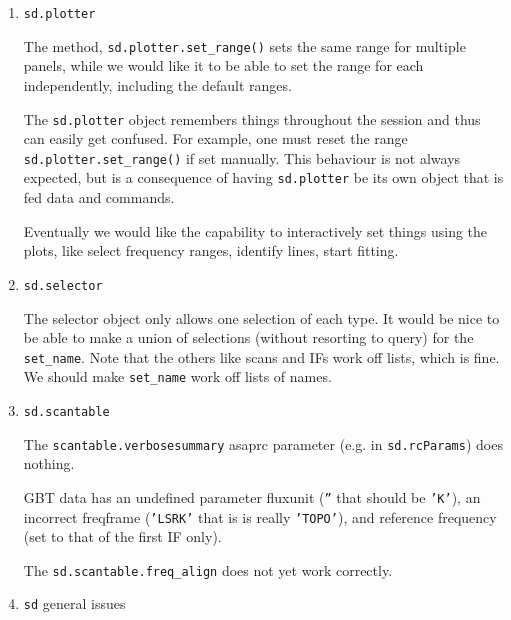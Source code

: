 \begin{enumerate}

\item {\tt sd.plotter}

  The method, {\tt sd.plotter.set\_range()} sets the same range for
  multiple panels, while we would like it to be able to set the
  range for each independently, including the default ranges.

  The {\tt sd.plotter} object remembers things throughout the session and
  thus can easily get confused. For example, one must reset the
  range {\tt sd.plotter.set\_range()} if set manually. This behaviour is
  not always expected, but is a consequence of having {\tt sd.plotter} be
  its own object that is fed data and commands.

  Eventually we would like the capability to interactively
  set things using the plots, like select frequency ranges,
  identify lines, start fitting. 

\item {\tt sd.selector}

  The selector object only allows one selection of each type.  It would be 
  nice to be able to make a union of selections (without resorting to query)
  for the {\tt set\_name}.  Note that the others like scans and IFs work off
  lists, which is fine.  We should make {\tt set\_name} work off lists of names.

\item {\tt sd.scantable}

  The {\tt scantable.verbosesummary}
  asaprc parameter (e.g. in {\tt sd.rcParams}) does nothing.

  GBT data has an undefined parameter fluxunit ({\tt ''} that should be {\tt 'K'}), an 
  incorrect freqframe ({\tt 'LSRK'} that is is really {\tt 'TOPO'}), and reference
  frequency (set to that of the first IF only).


  The {\tt sd.scantable.freq\_align} does not yet work correctly.


\item {\tt sd} general issues


\end{enumerate}
